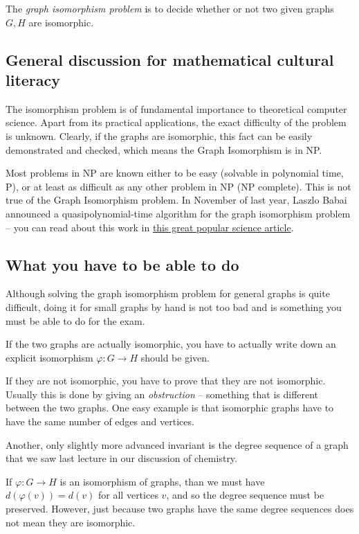 \documentclass[]{article}
\begin{document}
The \emph{graph isomorphism problem} is to decide whether or not two
given graphs \(G, H\) are isomorphic.

\subsection{General discussion for mathematical cultural
literacy}\label{general-discussion-for-mathematical-cultural-literacy}

The isomorphism problem is of fundamental importance to theoretical
computer science. Apart from its practical applications, the exact
difficulty of the problem is unknown. Clearly, if the graphs are
isomorphic, this fact can be easily demonstrated and checked, which
means the Graph Isomorphism is in NP.

Most problems in NP are known either to be easy (solvable in polynomial
time, P), or at least as difficult as any other problem in NP (NP
complete). This is not true of the Graph Isomorphism problem. In
November of last year, Laszlo Babai announced a quasipolynomial-time
algorithm for the graph isomorphism problem -- you can read about this
work in
\href{https://www.quantamagazine.org/20151214-graph-isomorphism-algorithm/}{this
great popular science article}.

\subsection{What you have to be able to
do}\label{what-you-have-to-be-able-to-do}

Although solving the graph isomorphism problem for general graphs is
quite difficult, doing it for small graphs by hand is not too bad and is
something you must be able to do for the exam.

If the two graphs are actually isomorphic, you have to actually write
down an explicit isomorphism \(\varphi:G\to H\) should be given.

If they are not isomorphic, you have to prove that they are not
isomorphic. Usually this is done by giving an \emph{obstruction} --
something that is different between the two graphs. One easy example is
that isomorphic graphs have to have the same number of edges and
vertices.

Another, only slightly more advanced invariant is the degree sequence of
a graph that we saw last lecture in our discussion of chemistry.

If \(\varphi:G \to H\) is an isomorphism of graphs, than we must have
\(d(\varphi(v))=d(v)\) for all vertices \(v\), and so the degree
sequence must be preserved. However, just because two graphs have the
same degree sequences does not mean they are isomorphic.
\end{document}
